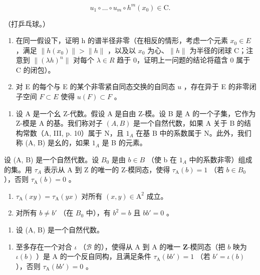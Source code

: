 \[
u _ {1} \circ \dots \circ u _ {m} \circ h ^ {m} (x _ {0}) \in \mathrm{C}.
\]

（打乒乓球。）

\begin{enumerate}
\def\labelenumi{\alph{enumi})}
\setcounter{enumi}{2}
\item
  在同一假设下，证明 h 的谱半径非零（在相反的情形，考虑一个元素 \(x_{0} \in E\) ，满足 \(\|h(x_{0})\| > \|h\|\) ，以及以 \(x_{0}\) 为心、\(\|h\|\) 为半径的闭球 C；注意到 \(\|( \lambda h)^{n}\|\) 对每个 \(\lambda \in R\) 趋于 0，证明上一问题的结论将蕴含 0 属于 C 的闭包）。
\item
  对 E 的每个与 E 的某个非零紧自同态交换的自同态 \(u\) ，存在异于 E 的非零闭子空间 \(F \subset E\) 使得 \(u(F) \subset F\) 。
\end{enumerate}

\begin{enumerate}
\def\labelenumi{\arabic{enumi})}
\setcounter{enumi}{5}
\tightlist
\item
  设 A 是一个幺 Z-代数。假设 A 是自由 Z-模。设 B 是 A 的一个子集，它作为 Z-模是 A 的基。我们称对子 \((A, B)\) 是一个自然代数，如果 A 关于 B 的结构常数（A, III, p. 10）属于 N，且 \(1_{A}\) 在基 B 中的系数属于 N。此外，我们称 (A, B) 是幺的，如果 \(1_{A}\) 是 B 的元素。
\end{enumerate}

设 (A, B) 是一个自然代数。设 \(B_{0}\) 是由 \(b \in B\) （使 b 在 \(1_{A}\) 中的系数非零）组成的集。用 \(\tau_{A}\) 表示从 A 到 Z 的唯一的 Z-模同态，使得 \(\tau_{\mathrm{A}}(b) = 1\) （若 \(b \in B_{0}\) ），否则 \(\tau_{\mathrm{A}}(b) = 0\) 。

\begin{enumerate}
\def\labelenumi{\alph{enumi})}
\item
  \(\tau_{\mathrm{A}}(xy) = \tau_{\mathrm{A}}(yx)\) 对所有 \((x,y)\in \mathrm{A}^2\) 成立。
\item
  对所有 \(b \neq b'\) （在 \(B_{0}\) 中），有 \(b^2 = b\) 且 \(bb' = 0\) 。
\end{enumerate}

\begin{enumerate}
\def\labelenumi{\arabic{enumi})}
\setcounter{enumi}{6}
\tightlist
\item
  设 (A, B) 是一个自然代数。
\end{enumerate}

\begin{enumerate}
\def\labelenumi{\alph{enumi})}
\tightlist
\item
  至多存在一个对合 \(\iota\) （\(\mathcal{B}\) 的），使得从 A 到 A 的唯一 \(\mathbf{Z}\)-模同态（把 \(b\) 映为 \(\iota(b)\) ）是 A 的一个反自同构，且满足条件 \(\tau_{\mathrm{A}}(bb') = 1\) （若 \(b' = \iota(b)\) ），否则 \(\tau_{\mathrm{A}}(bb') = 0\) 。
\end{enumerate}

